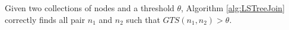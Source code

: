 \begin{theorem} Given two collections of nodes and a threshold $\theta$, Algorithm \ref{alg:LSTreeJoin} correctly finds all pair $n_1$ and $n_2$ such that $GTS(n_1,n_2) > \theta$.
\end{theorem}

%
%
%
%
%
%




%
%
%
%
%

